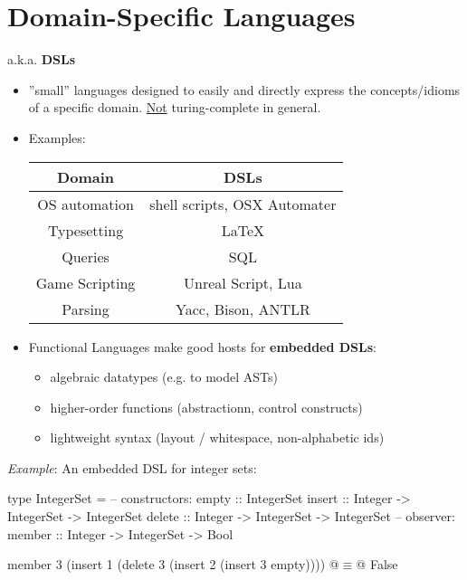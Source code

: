 


\section{Domain-Specific Languages} %
\label{cha:domain_specific_languages}
a.k.a. \textbf{DSLs}

\begin{itemize}
    \item ''small'' languages designed to easily and directly express the concepts/idioms of a specific domain. \underline{Not} turing-complete in general.
    \item Examples:
        \begin{center}\begin{tabular}{|c|c|}\hline
        \rowcolor{grau} Domain          & DSLs                                  \\\hline
                        OS automation   & shell scripts, OSX Automater          \\\hline
                        Typesetting     & \LaTeX                                \\\hline
                        Queries         & SQL                                   \\\hline
                        Game Scripting  & Unreal Script, Lua                    \\\hline
                        Parsing         & Yacc, Bison, ANTLR                    \\\hline
        \end{tabular}\end{center}
    \item Functional Languages make good hosts for \textbf{embedded DSLs}:
        \begin{itemize}
            \item algebraic datatypes (e.g. to model ASTs)
            \item higher-order functions (abstractionn, control constructs)
            \item lightweight syntax (layout / whitespace, non-alphabetic ids)
        \end{itemize}
\end{itemize}

\textit{Example}: An embedded DSL for integer sets:\\
\begin{Haskell}
type IntegerSet = 
    -- constructors:
    empty :: IntegerSet
    insert :: Integer -> IntegerSet -> IntegerSet
    delete :: Integer -> IntegerSet -> IntegerSet
    -- observer:
    member :: Integer -> IntegerSet -> Bool

member 3 (insert 1 (delete 3 (insert 2 (insert 3 empty))))
    @$\equiv$@ False
\end{Haskell}

